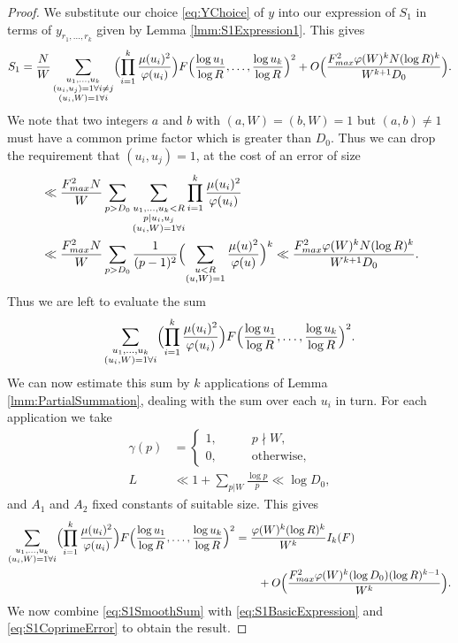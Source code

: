 \documentclass[12pt,a4paper]{amsart}
\theoremstyle{plain}
\numberwithin{sblmm}{thrm}
\numberwithin{equation}{section}
\renewcommand{\phi}{\varphi}
\begin{document}
\begin{proof}
We substitute our choice \eqref{eq:YChoice} of $y$ into our expression of $S_1$ in terms of $y_{r_1,\dotsc,r_k}$ given by Lemma \ref{lmm:S1Expression1}. This gives
\begin{equation}
S_1=\frac{N}{W}\sum_{\substack{u_1,\dotsc,u_k\\ (u_i,u_j)=1\forall i\ne j\\ (u_i,W)=1\forall i}}\Bigl(\prod_{i=1}^{k}\frac{\mu(u_i)^2}{\phi(u_i)}\Bigr)F\Bigl(\frac{\log{u_1}}{\log{R}},\dotsc,\frac{\log{u_k}}{\log{R}}\Bigr)^2+O\Bigl(\frac{F_{max}^2 \phi(W)^k N (\log{R})^k}{W^{k+1} D_0}\Bigr).\label{eq:S1BasicExpression}
\end{equation}
We note that two integers $a$ and $b$ with $(a,W)=(b,W)=1$ but $(a,b)\ne 1$ must have a common prime factor which is greater than $D_0$. Thus we can drop the requirement that $(u_{i},u_{j})=1$, at the cost of an error of size
\begin{align}
&\ll \frac{F_{max}^2 N}{W}\sum_{p>D_0}\sum_{\substack{u_1,\dotsc,u_k<R\\ p|u_{i},u_{j}\\ (u_i,W)=1\forall i}}\prod_{i=1}^k\frac{\mu(u_i)^2}{\phi(u_i)}\nonumber\\
&\ll \frac{F_{max}^2 N}{W}\sum_{p>D_0}\frac{1}{(p-1)^2}\Bigl(\sum_{\substack{u<R\\ (u,W)=1}}\frac{\mu(u)^2}{\phi(u)}\Bigr)^k\ll \frac{F_{max}^2 \phi(W)^k N (\log{R})^k}{W^{k+1} D_0}.\label{eq:S1CoprimeError}
\end{align}
Thus we are left to evaluate the sum
\begin{equation}
\sum_{\substack{u_1,\dotsc,u_k\\ (u_i,W)=1\forall i}}\Bigl(\prod_{i=1}^{k}\frac{\mu(u_i)^2}{\phi(u_i)}\Bigr)F\Bigl(\frac{\log{u_1}}{\log{R}},\dotsc,\frac{\log{u_k}}{\log{R}}\Bigr)^2.
\end{equation}
We can now estimate this sum by $k$ applications of Lemma \ref{lmm:PartialSummation}, dealing with the sum over each $u_i$ in turn. For each application we take
\begin{align}
\gamma(p)&=\begin{cases}1,\qquad &p\nmid W,\\
0,&\text{otherwise,}\end{cases}\\
L&\ll 1+\sum_{p|W}\frac{\log{p}}{p}\ll \log{D_0},
\end{align}
and $A_1$ and $A_2$ fixed constants of suitable size. This gives
\begin{align}
\sum_{\substack{u_1,\dotsc,u_k\\ (u_i,W)=1\forall i}}\Bigl(\prod_{i=1}^{k}\frac{\mu(u_i)^2}{\phi(u_i)}\Bigr)F\Bigl(\frac{\log{u_1}}{\log{R}},\dotsc,\frac{\log{u_k}}{\log{R}}\Bigr)^2&=\frac{\phi(W)^k (\log{R})^k}{W^k}I_k(F)\nonumber\\
&\qquad+O\Bigl(\frac{F_{max}^2\phi(W)^k(\log{D_0})(\log{R})^{k-1}}{W^k}\Bigr).\label{eq:S1SmoothSum}
\end{align}
We now combine \eqref{eq:S1SmoothSum} with \eqref{eq:S1BasicExpression} and \eqref{eq:S1CoprimeError} to obtain the result.
\end{proof}
\end{document}
